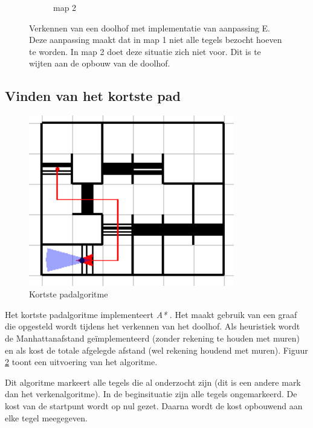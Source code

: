 \documentclass[tt3]{penoverslag}
\begin{document}
\begin{figure}
\begin{subfigure}[hb]{0.36\textwidth}
                \caption{map 2}
        \end{subfigure}
 \caption[Verkennen van een doolhof]{Verkennen van een doolhof met implementatie van aanpassing E. Deze aanpassing maakt dat in map 1 niet alle tegels bezocht hoeven te worden. In map 2 doet deze situatie zich niet voor. Dit is te wijten aan de opbouw van de doolhof.}
\label{fig:resultVerkenE}
\end{figure}

\subsection{Vinden van het kortste pad} %
\label{ssec:AlgoKortsteP}

\begin{figure}[tbp]
\begin{center}
    \includegraphics[width=0.8\textwidth]{kortstepadvisual}
    \caption{Kortste padalgoritme}
	\label{fig:kortstepad}
\end{center}
\end{figure}

Het kortste padalgoritme implementeert \textit{A*} \cite{A*}. Het maakt gebruik van een graaf die opgesteld wordt tijdens het verkennen van het doolhof. Als heuristiek wordt de Manhattanafstand \cite{manhattan} ge\"implementeerd (zonder rekening te houden met muren) en als kost de totale afgelegde afstand (wel rekening houdend met muren). Figuur \ref{fig:kortstepad} toont een uitvoering van het algoritme.

Dit algoritme markeert alle tegels die al onderzocht zijn (dit is een andere mark dan het verkenalgoritme). In de beginsituatie zijn alle tegels ongemarkeerd. De kost van de startpunt wordt op nul gezet. Daarna wordt de kost opbouwend aan elke tegel meegegeven.
\end{document}
